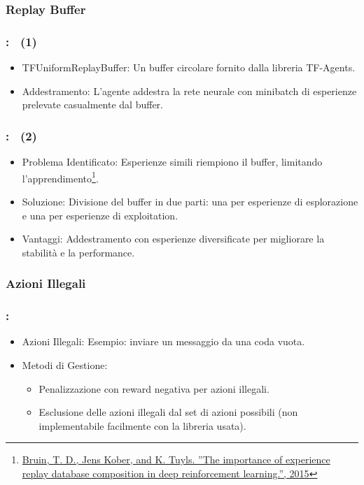 \documentclass[compress]{beamer}
\begin{document}
\subsubsection{Replay Buffer}
\begin{frame}
    \frametitle{\subsecname: \subsubsecname\ (1)}
    \begin{itemize}
        \item TFUniformReplayBuffer: Un buffer circolare fornito dalla libreria TF-Agents.
        \item Addestramento: L'agente addestra la rete neurale con minibatch di esperienze prelevate casualmente dal buffer.
    \end{itemize}
\end{frame}

\begin{frame}
    \frametitle{\subsecname: \subsubsecname\ (2)}
    \begin{itemize}
        \item Problema Identificato: Esperienze simili riempiono il buffer, limitando l'apprendimento\footnote{\href{https://rll.berkeley.edu/deeprlworkshop/papers/database_composition.pdf}{ Bruin, T. D., Jens Kober, and K. Tuyls. ”The importance of experience replay database composition in deep reinforcement learning.”, 2015}}.
        \item Soluzione: Divisione del buffer in due parti: una per esperienze di esplorazione e una per esperienze di exploitation.
        \item Vantaggi: Addestramento con esperienze diversificate per migliorare la stabilità e la performance.
    \end{itemize}
\end{frame}

\subsubsection*{Azioni Illegali}
\begin{frame}
    \frametitle{\subsecname: \subsubsecname}
    \begin{itemize}
        \item Azioni Illegali: Esempio: inviare un messaggio da una coda vuota.
        \item Metodi di Gestione:
        \begin{itemize}
            \item Penalizzazione con reward negativa per azioni illegali.
            \item Esclusione delle azioni illegali dal set di azioni possibili (non implementabile facilmente con la libreria usata).
        \end{itemize}
    \end{itemize}
    \end{frame}
\end{document}
